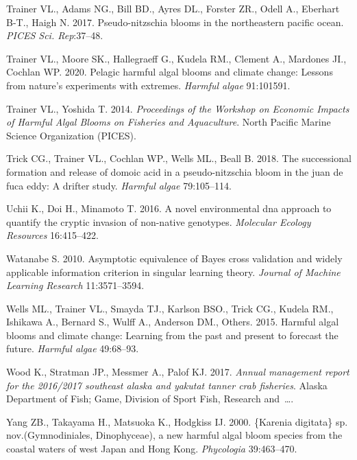 \documentclass[
]{article}
\begin{document}
\leavevmode\hypertarget{ref-trainer2017pseudo}{}%
Trainer VL., Adams NG., Bill BD., Ayres DL., Forster ZR., Odell A.,
Eberhart B-T., Haigh N. 2017. Pseudo-nitzschia blooms in the
northeastern pacific ocean. \emph{PICES Sci. Rep}:37--48.

\leavevmode\hypertarget{ref-trainer2020pelagic}{}%
Trainer VL., Moore SK., Hallegraeff G., Kudela RM., Clement A., Mardones
JI., Cochlan WP. 2020. Pelagic harmful algal blooms and climate change:
Lessons from nature's experiments with extremes. \emph{Harmful algae}
91:101591.

\leavevmode\hypertarget{ref-trainer2014proceedings}{}%
Trainer VL., Yoshida T. 2014. \emph{Proceedings of the Workshop on
Economic Impacts of Harmful Algal Blooms on Fisheries and Aquaculture}.
North Pacific Marine Science Organization (PICES).

\leavevmode\hypertarget{ref-trick2018successional}{}%
Trick CG., Trainer VL., Cochlan WP., Wells ML., Beall B. 2018. The
successional formation and release of domoic acid in a pseudo-nitzschia
bloom in the juan de fuca eddy: A drifter study. \emph{Harmful algae}
79:105--114.

\leavevmode\hypertarget{ref-uchii2016novel}{}%
Uchii K., Doi H., Minamoto T. 2016. A novel environmental dna approach
to quantify the cryptic invasion of non-native genotypes.
\emph{Molecular Ecology Resources} 16:415--422.

\leavevmode\hypertarget{ref-watanabe2010asymptotic}{}%
Watanabe S. 2010. Asymptotic equivalence of Bayes cross validation and
widely applicable information criterion in singular learning theory.
\emph{Journal of Machine Learning Research} 11:3571--3594.

\leavevmode\hypertarget{ref-wells2015harmful}{}%
Wells ML., Trainer VL., Smayda TJ., Karlson BSO., Trick CG., Kudela RM.,
Ishikawa A., Bernard S., Wulff A., Anderson DM., Others. 2015. Harmful
algal blooms and climate change: Learning from the past and present to
forecast the future. \emph{Harmful algae} 49:68--93.

\leavevmode\hypertarget{ref-wood2017annual}{}%
Wood K., Stratman JP., Messmer A., Palof KJ. 2017. \emph{Annual
management report for the 2016/2017 southeast alaska and yakutat tanner
crab fisheries}. Alaska Department of Fish; Game, Division of Sport
Fish, Research and~\ldots.

\leavevmode\hypertarget{ref-yang2000karenia}{}%
Yang ZB., Takayama H., Matsuoka K., Hodgkiss IJ. 2000. \{Karenia
digitata\} sp. nov.(Gymnodiniales, Dinophyceae), a new harmful algal
bloom species from the coastal waters of west Japan and Hong Kong.
\emph{Phycologia} 39:463--470.
\end{document}
